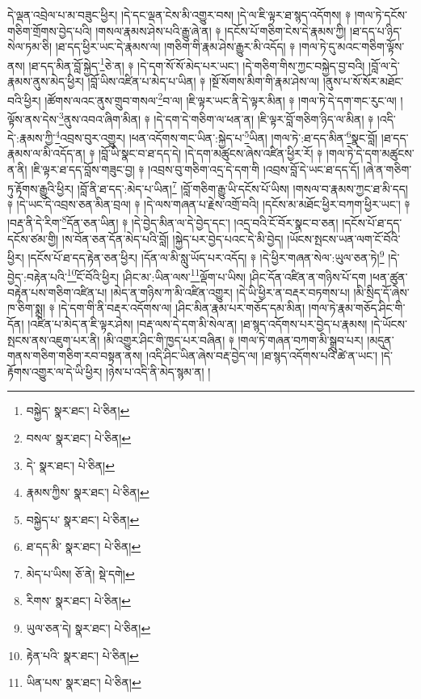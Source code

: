 དེ་ལྡན་འབྲེལ་པ་མ་བཟུང་ཕྱིར། །དེ་དང་ལྡན་ངེས་མི་འགྱུར་བས། །དེ་ལ་ཇི་ལྟར་ཐ་སྙད་འདོགས། ༈ །གལ་ཏེ་དངོས་གཅིག་གྲོགས་བྱེད་པའི། །གསལ་རྣམས་ཤེས་པའི་རྒྱུ་ཞེ་ན། ༈ །དངོས་པོ་གཅིག་ངེས་དེ་རྣམས་ཀྱི། །ཐ་དད་པ་ཉིད་སེལ་ཏམ་ཅི། །ཐ་དད་ཕྱིར་ཡང་དེ་རྣམས་ལ། །གཅིག་གི་རྣམ་ཤེས་རྒྱུར་མི་འདོད། ༈ །གལ་ཏེ་དུ་མའང་གཅིག་ལྟོས་ནས། །ཐ་དད་མིན་བློ་སྐྱེད་\footnote{བསྐྱེད་  སྣར་ཐང་།  པེ་ཅིན། }ཅེ་ན། ༈ །དེ་དག་སོ་སོ་མེད་པར་ཡང་། །དེ་གཅིག་གིས་ཀྱང་བསྐྱེད་བྱ་བའི། །བློ་ལ་དེ་རྣམས་ནུས་མེད་ཕྱིར། །བློ་ཡིས་འཛིན་པ་མེད་པ་ཡིན། ༈ །སྔོ་སོགས་མིག་གི་རྣམ་ཤེས་ལ། །ནུས་པ་སོ་སོར་མཐོང་བའི་ཕྱིར། །ཚོགས་ལའང་ནུས་གྲུབ་གསལ་\footnote{བསལ་  སྣར་ཐང་།  པེ་ཅིན། }བ་ལ། །ཇི་ལྟར་ཡང་ནི་དེ་ལྟར་མིན། ༈ །གལ་ཏེ་དེ་དག་གང་རུང་ལ། །ལྟོས་ནས་དེས་\footnote{དེ་  སྣར་ཐང་།  པེ་ཅིན། }ནུས་འབའ་ཞིག་མིན། ༈ །དེ་དག་དེ་གཅིག་ལ་ཕན་ན། །ཇི་ལྟར་བློ་གཅིག་ཉིད་ལ་མིན། ༈ །འདི་དེ་:རྣམས་ཀྱི་\footnote{རྣམས་ཀྱིས་  སྣར་ཐང་།  པེ་ཅིན། }འབྲས་བུར་འགྱུར། །ཕན་འདོགས་གང་ཡིན་:སྐྱེད་པ་\footnote{བསྐྱེད་པ་  སྣར་ཐང་།  པེ་ཅིན། }ཡིན། །གལ་ཏེ་:ཐ་དད་མིན་\footnote{ཐ་དད་མི་  སྣར་ཐང་།  པེ་ཅིན། }སྣང་བློ། །ཐ་དད་རྣམས་ལ་མི་འདོད་ན། ༈ །བློ་ཡི་སྣང་བ་ཐ་དད་དེ། །དེ་དག་མཚུངས་ཞེས་འཛིན་ཕྱིར་རོ། ༈ །གལ་ཏེ་དེ་དག་མཚུངས་ན་ནི། །ཇི་ལྟར་ཐ་དད་བློས་གཟུང་བྱ། ༈ །འབྲས་བུ་གཅིག་འདྲ་དེ་དག་གི །འབྲས་བློ་དེ་ཡང་ཐ་དད་དོ། །ཞེ་ན་གཅིག་ཏུ་རྟོགས་རྒྱུའི་ཕྱིར། །བློ་ནི་ཐ་དད་:མེད་པ་ཡིན།\footnote{མེད་པ་ཡིས།  ཅོ་ནེ།  སྡེ་དགེ། } །བློ་གཅིག་རྒྱུ་ཡི་དངོས་པོ་ཡིས། །གསལ་བ་རྣམས་ཀྱང་ཐ་མི་དད། ༈ །དེ་ཡང་དེ་འབྲས་ཅན་མིན་བྲལ། ༈ །དེ་ལས་གཞན་པ་རྗེས་འགྲོ་བའི། །དངོས་མ་མཐོང་ཕྱིར་བཀག་ཕྱིར་ཡང་། ༈ །བརྡ་ནི་དེ་རིག་\footnote{རིགས་  སྣར་ཐང་།  པེ་ཅིན། }དོན་ཅན་ཡིན། ༈ །དེ་བྱེད་མིན་ལ་དེ་བྱེད་དང་། །འདྲ་བའི་ངོ་བོར་སྣང་བ་ཅན། །དངོས་པོ་ཐ་དད་དངོས་ཙམ་གྱི། །ས་བོན་ཅན་དོན་མེད་པའི་བློ། །སྐྱེད་པར་བྱེད་པའང་དེ་མི་བྱེད། །ཡོངས་སྤངས་ཡན་ལག་ངོ་བོའི་ཕྱིར། །དངོས་པོ་ཐ་དད་རྟེན་ཅན་ཕྱིར། །དོན་ལ་མི་སླུ་ཡོད་པར་འདོད། ༈ །དེ་ཕྱིར་གཞན་སེལ་:ཡུལ་ཅན་ཏེ།\footnote{ཡུལ་ཅན་དེ།  སྣར་ཐང་།  པེ་ཅིན། } །དེ་བྱེད་:བརྟེན་པའི་\footnote{རྟེན་པའི་  སྣར་ཐང་།  པེ་ཅིན། }ངོ་བོའི་ཕྱིར། །ཤིང་མ་:ཡིན་ལས་\footnote{ཡིན་པས་  སྣར་ཐང་།  པེ་ཅིན། }ལྡོག་པ་ཡིས། །ཤིང་དོན་འཛིན་ན་གཉིས་པོ་དག །ཕན་ཚུན་བརྟེན་པས་གཅིག་འཛིན་པ། །མེད་ན་གཉིས་ཀ་མི་འཛིན་འགྱུར། །དེ་ཡི་ཕྱིར་ན་བརྡར་བཏགས་པ། །མི་སྲིད་དོ་ཞེས་ཁ་ཅིག་སྨྲ། ༈ །དེ་དག་གི་ནི་བརྡར་འདོགས་ལ། །ཤིང་མིན་རྣམ་པར་གཅོད་དམ་མིན། །གལ་ཏེ་རྣམ་གཅོད་ཤིང་གི་དོན། །འཛིན་པ་མེད་ན་ཇི་ལྟར་ཤེས། །བརྡ་ལས་དེ་དག་མི་སེལ་ན། །ཐ་སྙད་འདོགས་པར་བྱེད་པ་རྣམས། །དེ་ཡོངས་སྤངས་ནས་འཇུག་པར་ནི། །མི་འགྱུར་ཤིང་གི་ཁྱད་པར་བཞིན། ༈ །གལ་ཏེ་གཞན་བཀག་མི་སྒྲུབ་པར། །མདུན་གནས་གཅིག་གཅིག་རབ་བསྟན་ནས། །འདི་ཤིང་ཡིན་ཞེས་བརྡ་བྱེད་ལ། །ཐ་སྙད་འདོགས་པའི་ཚེ་ན་ཡང་། །དེ་རྟོགས་འགྱུར་ལ་དེ་ཡི་ཕྱིར། །ཉེས་པ་འདི་ནི་མེད་སྙམ་ན། །
